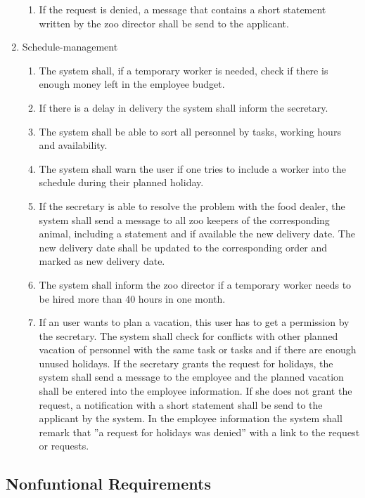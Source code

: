 \begin{enumerate}[label*=\arabic*]
\begin{enumerate}[label*=\arabic*]
        \item If the request is denied, a message that contains a short statement written by the zoo director shall be send to the applicant.
\end{enumerate}
\item Schedule-management
	\begin{enumerate}[label*=\arabic*]
		\item The system shall, if a temporary worker is needed, check if there is enough money left in the employee budget. 
		\item If there is a delay in delivery the system shall inform the secretary.
		\item The system shall be able to sort all personnel by tasks, working hours and availability.
		\item The system shall warn the user if one tries to include a worker into the schedule during their planned holiday.
		\item If the secretary is able to resolve the problem with the food dealer, the system shall send a message to all zoo keepers of the corresponding animal, including a statement and if available the new delivery date. The new delivery date shall be updated to the corresponding order and marked as new delivery date.
		\item The system shall inform the zoo director if a temporary worker needs to be hired more than 40 hours in one month.
		\item If an user wants to plan a vacation, this user has to get a permission by the secretary. The system shall check for conflicts with other planned vacation of personnel with the same task or tasks and if there are enough unused holidays. If the secretary grants the request for holidays, the system shall send a message to the employee and the planned vacation shall be entered into the employee information. If she does not grant the request, a notification with a short statement shall be send to the applicant by the system. In the employee information the system shall remark that ”a request for holidays was denied” with a link to the request or requests.
\end{enumerate}
\end{enumerate}

\subsection{Nonfuntional Requirements}

